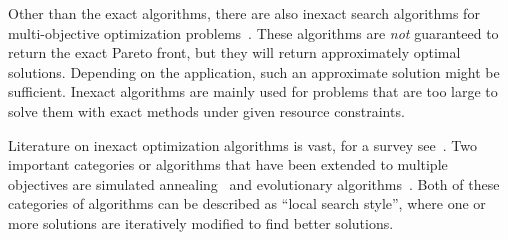 Other than the exact algorithms, there are also inexact search algorithms for multi-objective optimization problems~\autocite{Saini2021,DBLP:conf/evoW/Dubois-LacosteLS12,DBLP:journals/eor/Dubois-LacosteL15,DBLP:journals/eor/Jaszkiewicz18,DBLP:conf/ppsn/ZitzlerT98}.
These algorithms are \emph{not} guaranteed to return the exact Pareto front, but they will return approximately optimal solutions.
Depending on the application, such an approximate solution might be sufficient.
Inexact algorithms are mainly used for problems that are too large to solve them with exact methods under given resource constraints.

Literature on inexact optimization algorithms is vast, for a survey see~\autocite{Saini2021}.
Two important categories or algorithms that have been extended to multiple objectives are simulated annealing~\autocites{DBLP:journals/science/KirkpatrickGV83,DBLP:journals/tec/BandyopadhyaySMD08,DBLP:journals/isci/SenguptaS18} and evolutionary algorithms~\autocites{DBLP:books/daglib/0087893,DBLP:journals/jgo/StornP97,DBLP:journals/tec/DebAPM02,DBLP:conf/ppsn/ZitzlerT98}.
Both of these categories of algorithms can be described as ``local search style'', where one or more solutions are iteratively modified to find better solutions.